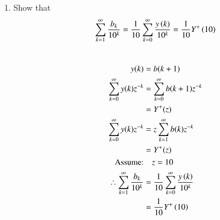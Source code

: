 \documentclass[journal,12pt,twocolumn]{IEEEtran}
\renewcommand\thesection{\arabic{section}}
\begin{document}
\begin{enumerate}[label=\thesection.\arabic*,ref=\thesection.\theenumi]
		\item 
			Show that 
			\begin{align}
				\sum_{k=1}^{\infty}\frac{b_k}{10^k} =
				\frac{1}{10}\sum_{k=0}^{\infty}\frac{y\left(k\right)}{10^k} =\frac{1}{10}Y^{+}\left({10}\right)
			\end{align}
		\solution\\
			\begin{align}
				y(k)&=b(k+1)\\
				\sum_{k=0}^{\infty} y(k) z^{-k}&=\sum_{k=0}^{\infty} b(k+1) z^{-k}\\ &=Y^{+}(z)\\
				\sum_{k=0}^{\infty} y(k) z^{-k}&=z\sum_{k=1}^{\infty} b(k) z^{-k}\\ &=Y^{+}(z)\\
				\text{Assume:}& \quad z=10\\
				\therefore \sum_{k=1}^{\infty}\frac{b_k}{10^k} & =
				\frac{1}{10}\sum_{k=0}^{\infty}\frac{y\left(k\right)}{10^k}\\ &=\frac{1}{10}Y^{+}\left({10}\right)
			\end{align}
	

\end{enumerate}
\end{document}
